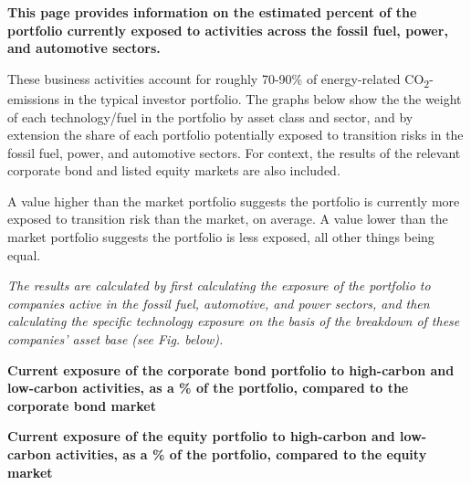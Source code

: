 \documentclass[10pt,table,a4]{article}\usepackage[]{graphicx}\usepackage[]{color}
\begin{document}
	\begin{multicols}{2}
		
		\textbf{This page provides information on the estimated percent of the portfolio currently exposed to activities across the fossil fuel, power, and automotive sectors. }
		
		These business activities account for roughly 70-90\% of energy-related CO\textsubscript{2}-emissions in the typical investor portfolio. The graphs below show the the weight of each technology/fuel in the portfolio by asset class and sector, and by extension the share of each portfolio potentially exposed to transition risks in the fossil fuel, power, and automotive sectors. For context, the results of the relevant corporate bond and listed equity markets are also included.
		
		A value higher than the market portfolio suggests the portfolio is currently more exposed to transition risk than the market, on average. A value lower than the market portfolio suggests the portfolio is less exposed, all other things being equal. 
		
		\textit{The results are calculated by first calculating the exposure of the portfolio to companies active in the fossil fuel, automotive, and power sectors, and then calculating the specific technology exposure on the basis of the breakdown of these companies' asset base (see Fig. below). }
		
		\vspace{-0.1cm}
		
	\end{multicols}
	
	\vspace{-0.7cm}
	
	\textbf{Current exposure of the corporate bond portfolio to high-carbon and low-carbon activities, as a \% of the portfolio, compared to the corporate bond market} %
	
	\vspace{-0.2cm}
	
	
	
	\textbf{Current exposure of the equity portfolio to high-carbon and low-carbon activities, as a \% of the portfolio, compared to the equity market} %
	
	\vspace{-0.2cm}
	
\end{document}
